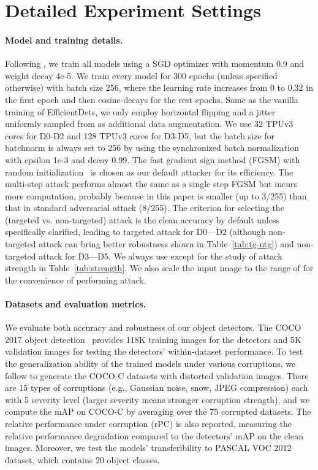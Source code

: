 \documentclass[final]{cvpr}
\begin{document}
\section{Detailed Experiment Settings}
\label{app:settings}
\paragraph{Model and training details.}
Following \cite{tan2020edet}, we train all models  using a SGD optimizer with momentum 0.9 and weight decay 4e-5.
We train every model for 300 epochs (unless specified otherwise) with batch size 256, where the learning rate increases from 0 to 0.32 in the first epoch and then cosine-decays for the rest epochs.
Same as the vanilla training of EfficientDets, we only employ horizontal flipping and a jitter uniformly sampled from  as additional data augmentation.
We use 32 TPUv3 cores for D0-D2 and 128 TPUv3 cores for D3-D5, but the batch size for batchnorm is always set to 256 by using the synchronized batch normalization~\cite{peng2018megdet} with epsilon 1e-3 and decay 0.99.
The fast gradient sign method (FGSM) with random initialization~\cite{goodfellow2015fgsm} is chosen as our default attacker for its efficiency.
The multi-step attack performs almost the same as a single step FGSM but incurs more computation, probably because  in this paper is smaller (up to 3/255) than that in standard adversarial attack (8/255).
The criterion for selecting the (targeted vs. non-targeted) attack is the clean accuracy by default unless specifically clarified, leading to targeted attack for D0---D2 (although non-targeted attack can bring better robustness shown in Table~\ref{tab:tg-ntg}) and non-targeted attack for D3---D5.
We always use  except for the study of attack strength in Table~\ref{tab:strength}.
We also scale the input image to the range of  for the convenience of performing attack.

\paragraph{Datasets and evaluation metrics.}
We evaluate both accuracy and robustness of our object detectors. The COCO 2017 object detection~\cite{lin2015coco} provides 118K training images for the detectors and 5K validation images for testing the detectors' within-dataset performance. 
To test the generalization ability of the trained models under various corruptions, we follow \cite{michaelis2020benchmarking} to generate the COCO-C datasets with distorted validation images.
There are 15 types of corruptions (e.g., Gaussian noise, snow, JPEG compression) each with 5 severity level (larger severity means stronger corruption strength), and we compute the mAP on COCO-C by averaging over the 75 corrupted datasets.
The relative performance under corruption (rPC) is also reported, measuring the relative performance degradation compared to the detectors' mAP on the clean images.
Moreover, we test the models' transferibility to PASCAL VOC 2012~\cite{pascal-voc-2012} dataset, which contains 20 object classes.
\end{document}
